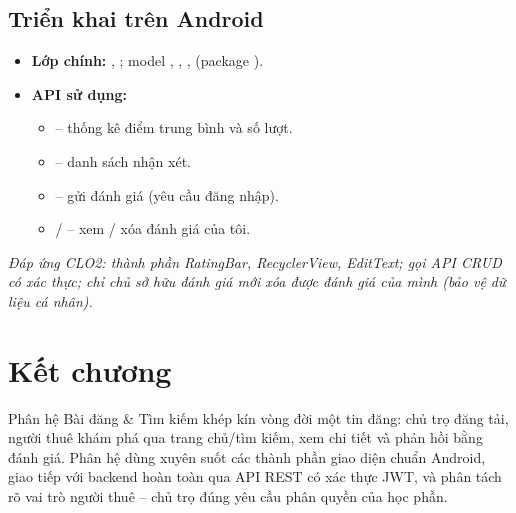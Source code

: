\subsection{Triển khai trên Android}
\begin{itemize}
    \item \textbf{Lớp chính:} ,
    ; model , ,
    , 
    (package ).
    \item \textbf{API sử dụng:}
    \begin{itemize}
        \item {} -- thống kê
        điểm trung bình và số lượt.
        \item {} --
        danh sách nhận xét.
        \item {} -- gửi đánh giá
        (yêu cầu đăng nhập).
        \item {} /  --
        xem / xóa đánh giá của tôi.
    \end{itemize}
\end{itemize}

\textit{Đáp ứng CLO2: thành phần RatingBar, RecyclerView, EditText; gọi API
CRUD có xác thực; chỉ chủ sở hữu đánh giá mới xóa được đánh giá của mình
(bảo vệ dữ liệu cá nhân).}

\section{Kết chương}
Phân hệ Bài đăng \& Tìm kiếm khép kín vòng đời một tin đăng: chủ trọ đăng tải,
người thuê khám phá qua trang chủ/tìm kiếm, xem chi tiết và phản hồi bằng đánh
giá. Phân hệ dùng xuyên suốt các thành phần giao diện chuẩn Android, giao tiếp
với backend hoàn toàn qua API REST có xác thực JWT, và phân tách rõ vai trò
người thuê -- chủ trọ đúng yêu cầu phân quyền của học phần.
